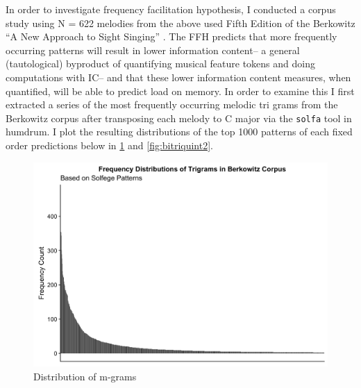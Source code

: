 \documentclass[]{book}
\begin{document}
In order to investigate frequency facilitation hypothesis, I conducted a corpus study using N = 622 melodies from the above used Fifth Edition of the Berkowitz ``A New Approach to Sight Singing'' \citep{berkowitzNewApproachSight2011}.
The FFH predicts that more frequently occurring patterns will result in lower information content-- a general (tautological) byproduct of quantifying musical feature tokens and doing computations with IC-- and that these lower information content measures, when quantified, will be able to predict load on memory.
In order to examine this I first extracted a series of the most frequently occurring melodic tri grams from the Berkowitz corpus after transposing each melody to C major via the \texttt{solfa} tool in humdrum.
I plot the resulting distributions of the top 1000 patterns of each fixed order predictions below in \ref{fig:bitriquint} and \ref{fig:bitriquint2}.

\begin{figure}

{\centering \includegraphics[width=1\linewidth]{img/trigrams} 

}

\caption{Distribution of m-grams}\label{fig:bitriquint}
\end{figure}
\end{document}
